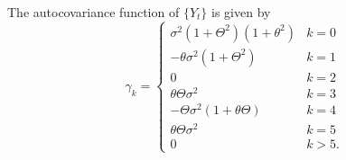 \documentclass[
]{article}
\begin{document}

The autocovariance function of \(\{Y_t\}\) is given by \[
  \gamma_k =
  \begin{cases}
    \sigma^2(1+\Theta^2)(1+\theta^2)     & k=0\\
    -\theta \sigma^2(1+\Theta^2)        & k=1\\
    0                                   & k=2\\
    \theta\Theta \sigma^2               & k=3\\
    -\Theta \sigma^2(1 + \theta\Theta)  & k=4\\
    \theta\Theta \sigma^2               & k=5\\
    0                                   & k>5.
  \end{cases}
\]
\end{document}
